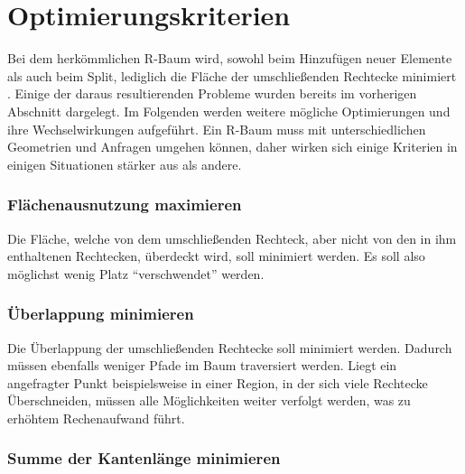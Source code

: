 \documentclass[runningheads,a4paper]{llncs}
\begin{document}

\section{Optimierungskriterien} %
\label{sec:optimierungskriterien}

	Bei dem herkömmlichen R-Baum wird, sowohl beim Hinzufügen neuer Elemente als auch beim Split, lediglich die Fläche der umschließenden Rechtecke minimiert \citep[vgl.][50-51]{Guttman:1984}. Einige der daraus resultierenden Probleme wurden bereits im vorherigen Abschnitt dargelegt.
	Im Folgenden werden weitere mögliche Optimierungen und ihre Wechselwirkungen aufgeführt. Ein R-Baum muss mit unterschiedlichen Geometrien und Anfragen umgehen können, daher wirken sich einige Kriterien in einigen Situationen stärker aus als andere.

	\subsubsection{Flächenausnutzung maximieren} %
	\label{ssub:flaechenausnutzung}

	Die Fläche, welche von dem umschließenden Rechteck, aber nicht von den in ihm enthaltenen Rechtecken, überdeckt wird, soll minimiert werden. Es soll also möglichst wenig Platz \enquote{verschwendet} werden. \citep[vgl.][323]{Beckmann:1990}


	\subsubsection{Überlappung minimieren} %
	\label{ssub:ueberlappung_minimieren}

	Die Überlappung der umschließenden Rechtecke soll minimiert werden. Dadurch müssen ebenfalls weniger Pfade im Baum traversiert werden. Liegt ein angefragter Punkt beispielsweise in einer Region, in der sich viele Rechtecke Überschneiden, müssen alle Möglichkeiten weiter verfolgt werden, was zu erhöhtem Rechenaufwand führt.


	\subsubsection{Summe der Kantenlänge minimieren} %
	\label{ssub:kantenlaenge}
\end{document}
